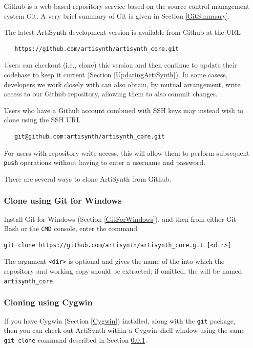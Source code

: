 Github is a web-based repository service based on the source control
management system Git. A very brief summary of Git is given in
Section \ref{GitSummary}.

The latest ArtiSynth development version is available from Github at the URL
\begin{verbatim}
   https://github.com/artisynth/artisynth_core.git
\end{verbatim}
Users can checkout (i.e., clone) this version and then continue to
update their codebase to keep it current
(Section \ref{UpdatingArtiSynth}). 
In some casess, developers we work closely with can also obtain, by
mutual arrangement, write access to our Github repository, allowing
them to also commit changes.

\begin{sideblock}
Users who have a Github account combined with SSH keys may instead
wish to clone using the SSH URL
\begin{verbatim}
   git@github.com:artisynth/artisynth_core.git
\end{verbatim}
For users with repository write access, this will allow them to
perform subsequent {\tt push} operations without having to
enter a username and password.
\end{sideblock}

There are several ways to clone ArtiSynth from Github.

\ifWindows

\subsubsection{Clone using Git for Windows}
\label{CloningUsingGitForWindows}

Install Git for Windows (Section \ref{GitForWindows}), and then from
either Git Bash or the {\tt CMD} console, enter the command
%
\begin{lstlisting}[]
  git clone https://github.com/artisynth/artisynth_core.git [<dir>]
\end{lstlisting}
%
The argument {\tt <dir>} is optional and gives the name of the
\directory{} into which the repository and working copy should be
extracted; if omitted, the \directory{} will be named {\tt
artisynth\_core}.

\subsubsection{Cloning using Cygwin}

If you have Cygwin (Section \ref{Cygwin}) installed, along with the
{\tt git} package, then you can check out ArtiSynth within a Cygwin
shell window using the same {\tt git clone} command described
in Section \ref{CloningUsingGitForWindows}.


